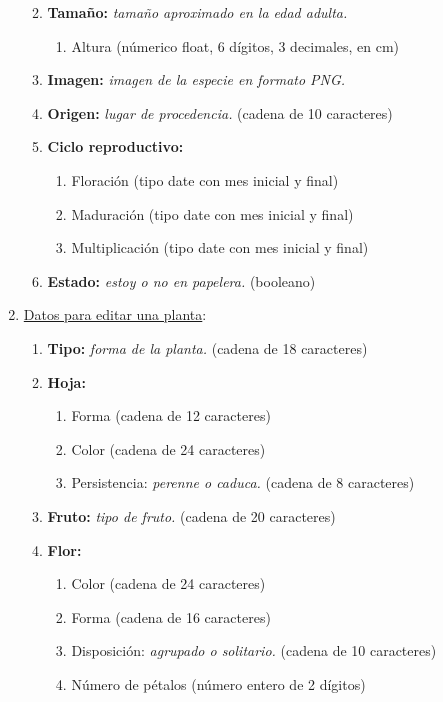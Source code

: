 \documentclass[10pt,a4paper]{article}
\begin{document}
\begin{enumerate}[label={RD\arabic*.} ,leftmargin=2.8\parindent]
\begin{enumerate}[label={RD1.\arabic*.}]
	\medskip
	
	\item
		\textbf{Tamaño:} \textit{tamaño aproximado en la edad adulta.}
	\begin{enumerate}[label=-]
		\item Altura (númerico float, 6 dígitos, 3 decimales, en cm)
	\end{enumerate}
	
	\medskip	
	\item
		\textbf{Imagen:} \textit{imagen de la especie en formato PNG.}

	\medskip 
	\item
		\textbf{Origen:} \textit{lugar de procedencia.} (cadena de 10 caracteres)
		
	\medskip 
	\item
		\textbf{Ciclo reproductivo:}
	\begin{enumerate} [label=-]
		\item Floración (tipo date con mes inicial y final)
		\item Maduración (tipo date con mes inicial y final)
		\item Multiplicación (tipo date con mes inicial y final)
	\end{enumerate}
	\medskip 
	\item
		\textbf{Estado:} \textit{estoy o no en papelera.} (booleano)
	\medskip \medskip
		\end{enumerate}
	
	\item \underline{Datos para editar una planta}:
	\begin{enumerate}[label={RD2.\arabic*.}]
	
	\item 
		\textbf{Tipo:} \textit{forma de la planta.} (cadena de 18 caracteres)

	\medskip
	\item
		\textbf{Hoja:}
	\begin{enumerate}[label=-]
		\item Forma (cadena de 12 caracteres)
		\item Color (cadena de 24 caracteres)
		\item Persistencia: \textit{perenne o caduca.} (cadena de 8 caracteres)
	\end{enumerate}

	\medskip	
	\item
		\textbf{Fruto:} \textit{tipo de fruto.} (cadena de 20 caracteres)

	\medskip
	\item
		\textbf{Flor:}
	\begin{enumerate} [label=-]
		\item Color (cadena de 24 caracteres)
		\item Forma (cadena de 16 caracteres)
		\item Disposición: \textit{agrupado o solitario.} (cadena de 10 caracteres)
		\item Número de pétalos (número entero de 2 dígitos)
	\end{enumerate}


\end{enumerate}
\end{enumerate}
\end{document}
